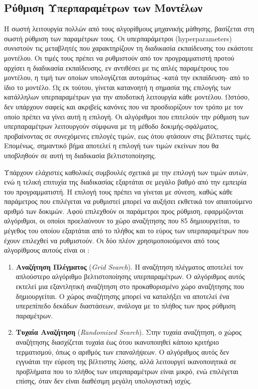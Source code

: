 \documentclass[diploma]{softlab-thesis}
\begin{document}
\begin{enumerate}
\begin{enumerate}
\section{Ρύθμιση Υπερπαραμέτρων των Μοντέλων}

Η σωστή λειτουργία πολλών από τους αλγορίθμους μηχανικής μάθησης, βασίζεται στη σωστή ρύθμιση των παραμέτρων τους. Οι υπερπαράμετροι (hyperparameters) συνιστούν τις μεταβλητές που χαρακτηρίζουν τη διαδικασία εκπαίδευσης του εκάστοτε μοντέλου. Οι τιμές τους πρέπει να ρυθμιστούν από τον προγραμματιστή προτού αρχίσει η διαδικασία εκπαίδευσης, εν αντιθέσει με τις απλές παραμέτρους του μοντέλου, η τιμή των οποίων υπολογίζεται αυτομάτως -κατά την εκπαίδευση- από το ίδιο το μοντέλο. Ως εκ τούτου, γίνεται κατανοητή η σημασία της επιλογής των κατάλληλων υπερπαραμέτρων για την αποδοτική λειτουργία κάθε μοντέλου. Ωστόσο, δεν υπάρχουν σαφείς και ακριβείς κανόνες που να προσδιορίζουν τον τρόπο με τον οποίο πρέπει να γίνει αυτή η επιλογή. Οι αλγόριθμοι που επιτελούν την ρύθμιση των υπερπαραμέτρων λειτουργούν σύμφωνα με τη μέθοδο δοκιμής-σφάλματος, προβαίνοντας σε συνεχόμενες επιλογές τιμών, εως ότου φτάσουν στις βέλτιστες τιμές. Επομένως, σημαντικό βήμα αποτελεί η επιλογή των τιμών εκείνων που θα υποβληθούν σε αυτή τη διαδικασία βελτιστοποίησης.

Υπάρχουν ελάχιστες καθολικές συμβουλές σχετικά με την επιλογή των τιμών αυτών, ενώ η τελική επιτυχία της
διαδικασίας εξαρτάται σε μεγάλο βαθμό από την εμπειρία του προγραμματιστή. Η επιλογή τους πρέπει να γίνεται με σύνεση, καθώς κάθε παράμετρος που επιλέγεται να ρυθμιστεί μπορεί να αυξήσει εκθετικά τον απαιτούμενο αριθμό των δοκιμών. Αφού επιλεχθούν οι παράμετροι προς ρύθμιση, εφαρμόζονται αλγόριθμοι, οι οποίοι προελαύνουν το χώρο αναζήτησης που 85 δημιουργείται, το μέγεθος του οποίου εξαρτάται από το πλήθος και το εύρος των υπερπαραμέτρων που έχουν επιλεχθεί να ρυθμιστούν. Οι δύο πλέον χρησιμοποιούμενοι από τους αλγορίθμους αυτούς είναι οι :
\vspace{0.5cm}



\begin{enumerate}
\item \textbf{Αναζήτηση Πλέγματος} (\textit{Grid Search}). Η αναζήτηση πλέγματος αποτελεί τον απλούστερο αλγόριθμο βελτιστοποίησης υπερπαραμέτρων. Ο αλγόριθμος αυτός εκτελεί μια εξαντλητική αναζήτηση στο προκαθορισμένο χώρο αναζήτησης που δημιουργείται. Ο χώρος αναζήτησης μπορεί να καταλήξει να αποτελεί ένα υπερεπίπεδο δεκάδων διαστάσεων, ανάλογα με το πλήθος των προς ρύθμιση παραμέτρων. 
\item \textbf{Τυχαία Αναζήτηση} (\textit{Randomized Search}). Στην τυχαία αναζήτηση, ο χώρος αναζήτησης διασχίζεται τυχαία έως ότου ικανοποιηθεί κάποιο κριτήριο τερματισμού, όπως ο αριθμός των επαναλήψεων. Ο αλγόριθμος αυτός δεν εγγυάται την εύρεση της βέλτιστης λύσης, αλλά λειτουργεί ικανοποιητικά σε προβλήματα που το πλήθος των υπερπαραμέτρων είναι μικρό, ενώ επιλέγεται επίσης, όταν δεν είναι διαθέσιμη μεγάλη υπολογιστική ισχύς.
\end{enumerate}
\vspace{0.5cm}





\end{enumerate}
\end{enumerate}
\end{document}
